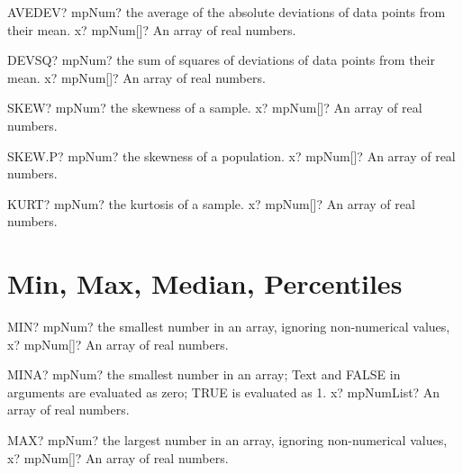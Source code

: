 \documentclass[12pt,a4paper,openany]{book}
\begin{document}
\begin{mpFunctionsExtract}
\mpWorksheetFunctionOneNotImplemented
{AVEDEV? mpNum? the average of the absolute deviations of data points from their mean.}
{x? mpNum[]? An array of real numbers.}
\end{mpFunctionsExtract}

\begin{mpFunctionsExtract}
\mpWorksheetFunctionOneNotImplemented
{DEVSQ? mpNum? the sum of squares of deviations of data points from their mean.}
{x? mpNum[]? An array of real numbers.}
\end{mpFunctionsExtract}

\begin{mpFunctionsExtract}
\mpWorksheetFunctionOneNotImplemented
{SKEW? mpNum? the skewness of a sample.}
{x? mpNum[]? An array of real numbers.}
\end{mpFunctionsExtract}

\begin{mpFunctionsExtract}
\mpWorksheetFunctionOneNotImplemented
{SKEW.P? mpNum? the skewness of a population.}
{x? mpNum[]? An array of real numbers.}
\end{mpFunctionsExtract}

\begin{mpFunctionsExtract}
\mpWorksheetFunctionOneNotImplemented
{KURT? mpNum? the kurtosis of a sample.}
{x? mpNum[]? An array of real numbers.}
\end{mpFunctionsExtract}

\section{Min, Max, Median, Percentiles}

\begin{mpFunctionsExtract}
\mpWorksheetFunctionOneNotImplemented
{MIN? mpNum? the smallest number in an array, ignoring non-numerical values,}
{x? mpNum[]? An array of real numbers.}
\end{mpFunctionsExtract}

\begin{mpFunctionsExtract}
\mpWorksheetFunctionOneNotImplemented
{MINA? mpNum? the smallest number in an array; Text and FALSE in arguments are evaluated as zero; TRUE is evaluated as 1.}
{x? mpNumList? An array of real numbers.}
\end{mpFunctionsExtract}

\begin{mpFunctionsExtract}
\mpWorksheetFunctionOneNotImplemented
{MAX? mpNum? the largest number in an array, ignoring non-numerical values,}
{x? mpNum[]? An array of real numbers.}
\end{mpFunctionsExtract}
\end{document}
